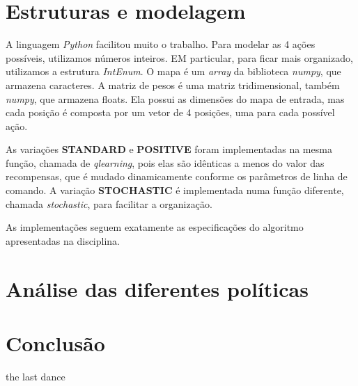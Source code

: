 \documentclass{article}
\begin{document}
\section{Estruturas e modelagem}

A linguagem \textit{Python} facilitou muito o trabalho. Para modelar as 4 ações possíveis, utilizamos números inteiros. EM particular, para ficar mais organizado,
utilizamos a estrutura \textit{IntEnum}. O mapa é um \textit{array} da biblioteca \textit{numpy}, que armazena caracteres. A matriz de pesos é uma matriz tridimensional,
também \textit{numpy}, que armazena floats. Ela possui as dimensões do mapa de entrada, mas cada posição é composta por um vetor de 4 posições, uma para cada possível ação.

As variações \textbf{STANDARD} e \textbf{POSITIVE} foram implementadas na mesma função, chamada de \textit{qlearning}, pois elas são idênticas a menos do valor das recompensas, que é mudado dinamicamente conforme
os parâmetros de linha de comando. A variação \textbf{STOCHASTIC} é implementada numa função diferente, chamada \textit{stochastic}, para facilitar a organização.

As implementações seguem exatamente as especificações do algoritmo apresentadas na disciplina.

\section{Análise das diferentes políticas}

\section{Conclusão}

the last dance
\end{document}
